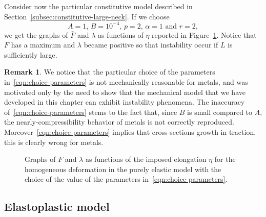 \documentclass[a4paper,10pt,twoside]{amsbook}
\numberwithin{section}{chapter}
\numberwithin{equation}{chapter}
\theoremstyle{definition}
\newtheorem{rmk}[prop]{Remark}
\begin{document}
Consider now the particular constitutive model described in Section~\ref{subsec:constitutive-large-neck}. If we choose
\begin{equation}
\label{eqn:choice-parameters}
\text{$A=1$, $B=10^{-4}$, $p=2$, $\alpha=1$ and $r=2$},
\end{equation}
we get the graphs of $\bar F$ and $\lambda$ as functions of $\eta$ reported in Figure~\ref{fig:instability}. Notice that $F$ has a maximum and $\lambda$ became positive so that instability occur if $L$ is sufficiently large.
\begin{rmk}
We notice that the particular choice of the parameters in~\eqref{eqn:choice-parameters} is not mechanically reasonable for metals, and was motivated only by the need to show that the mechanical model that we have developed in this chapter can exhibit instability phenomena. The inaccuracy of~\eqref{eqn:choice-parameters} stems to the fact that, since $B$ is small compared to $A$, the nearly-compressibility behavior of metals is not correctly reproduced. Moreover~\eqref{eqn:choice-parameters} implies that cross-sections growth in traction, this is clearly wrong for metals.
\end{rmk}

\begin{figure}
\hfill
{}
\caption{Graphs of $\bar F$ and $\lambda$ as functions of the imposed elongation $\eta$ for the homogeneous deformation in the purely elastic model with the choice of the value of the parameters in~\ref{eqn:choice-parameters}.}
\label{fig:instability}
\end{figure}

\subsection{Elastoplastic model}
\label{subsec:plastic-model}
\end{document}
